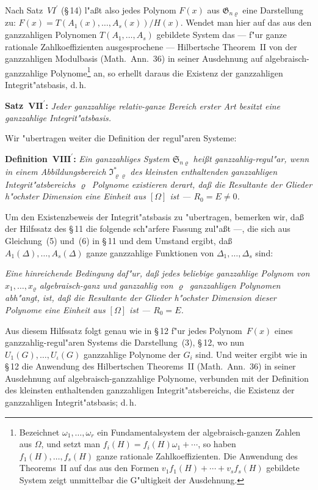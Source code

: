 \documentclass[11pt,a4paper]{article}
\begin{document}
Nach Satz~$VI^{\prime}$ (\S\,14) l"{a}\ss{}t also jedes Polynom $F(x)$ aus $\mathfrak{G}_{n\varrho}$
eine Darstellung zu:
$F(x)=T(A_{1}(x),\dots,A_{s}(x))/H(x)$.
Wendet man hier auf das aus den ganzzahligen Polynomen $T(A_{1},\dots,A_{s})$
gebildete System das --- f"{u}r ganze rationale Zahlkoeffizienten ausgesprochene
--- Hilbertsche Theorem~II von der ganzzahligen Modulbasis (Math.\ Ann.\ 36)
in seiner Ausdehnung auf algebraisch-ganzzahlige Polynome\footnote{Bezeichnet
$\omega_{1},\dots,\omega_{r}$ ein Fundamentalsystem der algebraisch-ganzen Zahlen aus $\Omega$,
und setzt man $f_{i}(H)=f_{i}(H)\omega_{1}+\cdots$, so haben $f_{1}(H),\dots,f_{s}(H)$ ganze
rationale Zahlkoeffizienten. Die Anwendung des Theorems~II auf das aus
den Formen $v_{1}f_{1}(H)+\cdots+v_{s}f_{s}(H)$ gebildete System zeigt unmittelbar
die G"{u}ltigkeit der Ausdehnung.} an, so erhellt daraus die Existenz der
ganzzahligen Integrit"{a}tsbasis, d.\,h.

\medskip
\noindent
\textbf{Satz~$\mathbf{VII}^{\boldsymbol{\prime}}$:} \emph{Jeder ganzzahlige relativ-ganze Bereich erster
Art besitzt eine ganzzahlige Integrit"{a}tsbasis.}

Wir "{u}bertragen weiter die Definition der regul"{a}ren Systeme:

\medskip
\noindent
\textbf{Definition~$\mathbf{VIII}^{\boldsymbol{\prime}}$:} \emph{Ein ganzzahliges System $\mathfrak{S}_{n\varrho}$ hei\ss{}t
\emph{ganzzahlig-regul"{a}r}, wenn in einem Abbildungsbereich $\mathfrak{I}_{\varrho\varrho}^{*}$ des kleinsten
enthaltenden ganzzahligen Integrit"{a}tsbereichs $\varrho$~Polynome existieren derart,
da\ss{} die Resultante der Glieder h"{o}chster Dimension eine Einheit aus
$[\Omega]$ ist --- $R_{0}=E\neq 0$.}

Um den Existenzbeweis der Integrit"{a}tsbasis zu "{u}bertragen, bemerken
wir, da\ss{} der Hilfssatz des \S\,11 die folgende sch"{a}rfere Fassung zul"{a}\ss{}t ---,
die sich aus Gleichung~(5) und~(6) in \S\,11 und dem Umstand ergibt,
da\ss{} $A_{1}(\Delta),\dots,A_{s}(\Delta)$ ganze ganzzahlige Funktionen von $\Delta_{1},\dots,\Delta_{s}$ sind:

\smallskip
\emph{Eine hinreichende Bedingung daf"{u}r, da\ss{} jedes beliebige ganzzahlige
Polynom von $x_{1},\dots,x_{\varrho}$ algebraisch-ganz und ganzzahlig von $\varrho$~ganzzahligen
Polynomen abh"{a}ngt, ist, da\ss{} die Resultante der Glieder h"{o}chster Dimension
dieser Polynome eine Einheit aus $[\Omega]$ ist --- $R_{0}=E$.}

Aus diesem Hilfssatz folgt genau wie in \S\,12 f"{u}r jedes Polynom~$F(x)$
eines ganzzahlig-regul"{a}ren Systems die Darstellung~(3), \S\,12, wo nun
$U_{1}(G),\dots,U_{\iota}(G)$ ganzzahlige Polynome der $G_{i}$ sind. Und weiter ergibt
wie in \S\,12 die Anwendung des Hilbertschen Theorems~II (Math.\ Ann.\ 36)
in seiner Ausdehnung auf algebraisch-ganzzahlige Polynome, verbunden
mit der Definition des kleinsten enthaltenden ganzzahligen Integrit"{a}tsbereichs,
die Existenz der ganzzahligen Integrit"{a}tsbasis; d.\,h.
\end{document}
